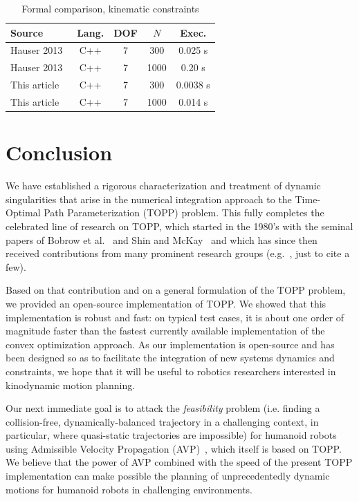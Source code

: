 \documentclass[9pt,technote]{IEEEtran}
\begin{document}
\begin{table}[th]
  \caption{Formal comparison, kinematic constraints}    
  \centering
    \begin{tabular}{|l|c|c|c|c|}
      \hline
      Source&Lang.&DOF&$N$&Exec.\\
      \hline      
      Hauser 2013~\cite{Hau13rss}&C++&7&300&0.025 s\\
      Hauser 2013~\cite{Hau13rss}&C++&7&1000&0.20 s\\
      This article&C++&7&300&0.0038 s\\
      This article&C++&7&1000&0.014 s\\
      \hline
     \end{tabular}
 \label{tab:formalcomp}  
\end{table}




\section{Conclusion}
\label{sec:conclusion}

We have established a rigorous characterization and treatment of
dynamic singularities that arise in the numerical integration approach
to the Time-Optimal Path Parameterization (TOPP) problem. This fully
completes the celebrated line of research on TOPP, which started in the
1980's with the seminal papers of Bobrow et al.~\cite{BobX85ijrr} and
Shin and McKay~\cite{SM86tac} and which has since then received
contributions from many prominent research groups
(e.g.~\cite{PJ87jra,SY89tra,SL92jdsmc,KS12rss}, just to cite a few).

Based on that contribution and on a general formulation of the TOPP
problem, we provided an open-source implementation of TOPP. We showed
that this implementation is robust and fast: on typical test cases, it
is about one order of magnitude faster than the fastest currently
available implementation of the convex optimization approach. As our
implementation is open-source and has been designed so as to
facilitate the integration of new systems dynamics and constraints, we
hope that it will be useful to robotics researchers interested in
kinodynamic motion planning.

Our next immediate goal is to attack the \emph{feasibility} problem
(i.e. finding a collision-free, dynamically-balanced trajectory in a
challenging context, in particular, where quasi-static trajectories
are impossible) for humanoid robots using Admissible Velocity
Propagation (AVP)~\cite{PhaX13rss}, which itself is based on TOPP. We
believe that the power of AVP combined with the speed of the present
TOPP implementation can make possible the planning of unprecedentedly
dynamic motions for humanoid robots in challenging environments.
\end{document}
